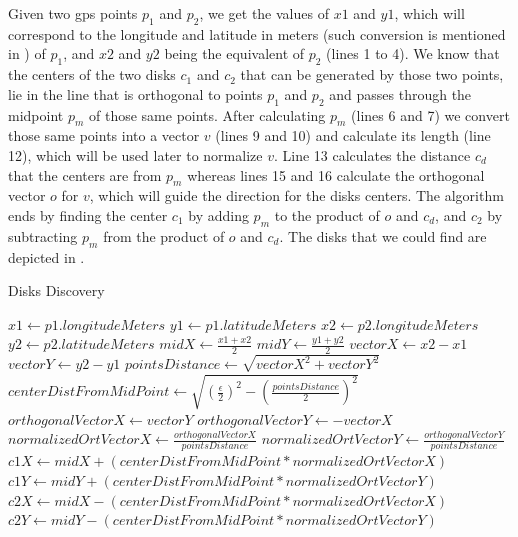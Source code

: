 Given two \ac{gps} points $p_1$ and $p_2$, we get the values of $x1$ and $y1$, which will correspond to the longitude
and latitude in meters (such conversion is mentioned in ) of $p_1$, and $x2$ and $y2$ being the
equivalent of $p_2$ (lines 1 to 4). We know that the centers of the two disks $c_1$ and $c_2$ that can be generated by
those two points, lie in the line that is orthogonal to points $p_1$ and $p_2$ and passes through the midpoint $p_m$ of
those same points. After calculating $p_m$ (lines 6 and 7) we convert those same points into a vector $v$ (lines 9 and
10) and calculate its length (line 12), which will be used later to normalize $v$. Line 13 calculates the distance $c_d$
that the centers are from $p_m$ whereas lines 15 and 16 calculate the orthogonal vector $o$ for $v$, which will guide
the direction for the disks centers. The algorithm ends by finding the center $c_1$ by adding $p_m$ to the product of
$o$ and $c_d$, and $c_2$ by subtracting $p_m$ from the product of $o$ and $c_d$. The disks that we could find are
depicted in .

\begin{algorithm}[h!]
\caption{Disks Discovery}
\label{alg:disks}
\begin{algorithmic}[1]
    \State $x1 \gets p1.longitudeMeters$
    \State $y1 \gets p1.latitudeMeters$
    \State $x2 \gets p2.longitudeMeters$
    \State $y2 \gets p2.latitudeMeters$
    \State
    \State $midX \gets \frac{x1 + x2}{2}$
    \State $midY \gets \frac{y1 + y2}{2}$
    \State
    \State $vectorX \gets x2 - x1$
    \State $vectorY \gets y2 - y1$
    \State
    \State $pointsDistance \gets \sqrt{vectorX^2 + vectorY^2}$
    \State $centerDistFromMidPoint \gets \sqrt{(\frac{\epsilon}{2})^2 - (\frac{pointsDistance}{2})^2}$
    \State
    \State $orthogonalVectorX \gets vectorY$
    \State $orthogonalVectorY \gets -vectorX$
    \State
    \State $normalizedOrtVectorX \gets \frac{orthogonalVectorX}{pointsDistance}$
    \State $normalizedOrtVectorY \gets \frac{orthogonalVectorY}{pointsDistance}$
    \State
    \State $c1X \gets midX + (centerDistFromMidPoint * normalizedOrtVectorX)$
    \State $c1Y \gets midY + (centerDistFromMidPoint * normalizedOrtVectorY)$
    \State
    \State $c2X \gets midX - (centerDistFromMidPoint * normalizedOrtVectorX)$
    \State $c2Y \gets midY - (centerDistFromMidPoint * normalizedOrtVectorY)$
\end{algorithmic}
\end{algorithm}

